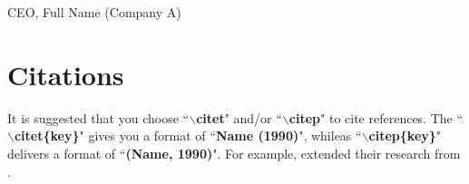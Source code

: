 \begin{flushright} CEO, Full Name (Company A) \end{flushright}


\section{Citations}
\label{subSec:Citations}

It is suggested that you choose ``\textbf{$\backslash$citet}" and/or ``\textbf{$\backslash$citep}" to cite references. The ``\textbf{$\backslash$citet\{key\}}" gives you a format of  ``\textbf{Name (1990)}", whileas ``\textbf{$\backslash$citep\{key\}}" delivers a format of ``\textbf{(Name, 1990)}". For example, \citet{Wang&Zeng:2009} extended their research from \citep{Zeng:2008}.